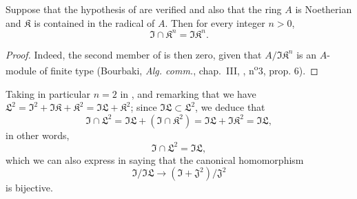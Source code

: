 \begin{corollary}[16.9.13.5]
\label{IV.16.9.13.5}
Suppose that the hypothesis of  are verified and also that the ring $A$ is Noetherian and $\mathfrak{K}$ is contained in the radical of $A$.
Then for every integer $n > 0$,
\[
  \label{IV.16.9.13.6}
  \mathfrak{I} \cap \mathfrak{K}^n = \mathfrak{I}\mathfrak{K}^n.
  \tag{16.9.13.6}
\]
\end{corollary}

\begin{proof}
Indeed, the second member of  is then zero, given that $A/\mathfrak{I}\mathfrak{K}^n$ is an $A$-module of finite type (Bourbaki, \emph{Alg. comm.}, chap.~III, , n\textsuperscript{o}3, prop. 6).
\end{proof}

Taking in particular $n = 2$ in , and remarking that we have $\mathfrak{L}^2 = \mathfrak{I}^2 + \mathfrak{I}\mathfrak{K} + \mathfrak{K}^2 = \mathfrak{I}\mathfrak{L} + \mathfrak{K}^2$;
since $\mathfrak{I}\mathfrak{L} \subset \mathfrak{L}^2$, we deduce that
\[
  \mathfrak{I} \cap \mathfrak{L}^2 = \mathfrak{I}\mathfrak{L} + (\mathfrak{I} \cap \mathfrak{K}^2) = \mathfrak{I}\mathfrak{L} + \mathfrak{I}\mathfrak{K}^2 = \mathfrak{I}\mathfrak{L},
\]
in other words, 
\[
  \label{IV.16.9.13.7}
  \mathfrak{I} \cap \mathfrak{L}^2 = \mathfrak{I}\mathfrak{L},
  \tag{16.9.13.7}
\]
which we can also express in saying that the canonical homomorphism
\[
  \mathfrak{I}/\mathfrak{I}\mathfrak{L} \to (\mathfrak{I} + \mathfrak{J}^2)/\mathfrak{J}^2
\]
is bijective.

